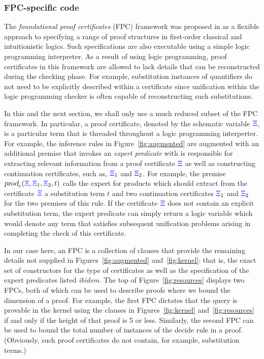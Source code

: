 \subsubsection{FPC-specific code}
\label{ssec:fpc}

The \emph{foundational proof certificates} (FPC) framework was
proposed in \cite{chihani17jar} as a flexible approach to specifying a
range of proof structures in first-order classical and intuitionistic
logics.  Such specifications are also executable using a simple logic
programming interpreter.  As a result of using logic programming,
proof certificates in this framework are allowed to lack details that
can be reconstructed during the checking phase.  For example,
substitution instances of quantifiers do not need to be explicitly
described within a certificate since unification within the logic
programming checker is often capable of reconstructing such
substitutions.

In this and the next section, we shall only use a much reduced subset
of the FPC framework.  In particular, a proof certificate, denoted by
the schematic variable ${\color{blue}{\Xi}}$, is a particular term that is threaded
throughout a logic programming interperter.  For example, the
inference rules in Figure~\ref{fig:augmented} are augmented with an
additional premise that invokes an \emph{expert predicate} with is
responsible for extracting relevant information from a proof
certificate ${\color{blue}{\Xi}}$ as well as constructing continuation certificates,
such as, ${\color{blue}{\Xi}}_1$ and ${\color{blue}{\Xi}}_2$.  For example, the premise
$\hbox{\sl prod}_e({\color{blue}{\Xi}},{\color{blue}{\Xi}}_1,{\color{blue}{\Xi}}_2,t)$ calls the expert for products which
should extract from the certificate ${\color{blue}{\Xi}}$ a substitution term $t$ and
two continuation certificates ${\color{blue}{\Xi}}_1$ and ${\color{blue}{\Xi}}_2$ for the two
premises of this rule.  If the certificate ${\color{blue}{\Xi}}$ does not contain an
explicit substitution term, the expert predicate can simply return a
logic variable which would denote any term that satisfies subsequent
unification problems arising in completing the check of this
certificate.

In our case here, an FPC is a collection of \lP clauses that provide
the remaining details not supplied in Figures~\ref{fig:augmented}
and~\ref{fig:kernel}: that is, the exact set of constructors for the
type of certificates  as well as the specification of the
expert predicates listed \emph{ibidem}.  The top of
Figure~\ref{fig:resources} displays two FPCs, both of which can be
used to describe proofs where we bound the dimension of a proof.  For
example, the first FPC dictates that the query \mbox{} is provable in the kernel using the clauses in
Figures~\ref{fig:kernel} and~\ref{fig:resources} if and only if the
height of that proof is 5 or less.  Similarly, the second FPC can be
used to bound the total number of instances of the decide rule in a
proof.  (Obviously, such proof certificates do not contain, for
example, substitution terms.)
%

